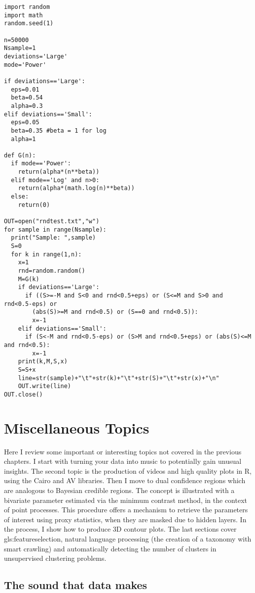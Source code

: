 \documentclass[oneside,10pt]{book}
\newcommand\Chapter[2]{
  \chapter[#1]{#1\\[2ex]\Large\itshape#2}
}
\begin{document}
\begin{lstlisting}
import random
import math
random.seed(1) 

n=50000
Nsample=1
deviations='Large'
mode='Power' 

if deviations=='Large':
  eps=0.01
  beta=0.54
  alpha=0.3
elif deviations=='Small':
  eps=0.05
  beta=0.35 #beta = 1 for log
  alpha=1

def G(n):
  if mode=='Power':
    return(alpha*(n**beta))
  elif mode=='Log' and n>0:
    return(alpha*(math.log(n)**beta))
  else:
    return(0)

OUT=open("rndtest.txt","w")
for sample in range(Nsample):
  print("Sample: ",sample)
  S=0
  for k in range(1,n):
    x=1
    rnd=random.random()
    M=G(k)
    if deviations=='Large':
      if ((S>=-M and S<0 and rnd<0.5+eps) or (S<=M and S>0 and rnd<0.5-eps) or 
        (abs(S)>=M and rnd<0.5) or (S==0 and rnd<0.5)):
        x=-1
    elif deviations=='Small':
      if (S<-M and rnd<0.5-eps) or (S>M and rnd<0.5+eps) or (abs(S)<=M and rnd<0.5):
        x=-1
    print(k,M,S,x)
    S=S+x
    line=str(sample)+"\t"+str(k)+"\t"+str(S)+"\t"+str(x)+"\n" 
    OUT.write(line)   
OUT.close()      
\end{lstlisting}

\Chapter{Miscellaneous Topics}{}

Here I review some important or interesting topics not covered in the previous chapters. I start with turning your data into music to 
potentially gain unusual insights. The second topic is the production of videos and high quality plots in R, using the Cairo and AV libraries. Then I move to dual confidence regions which are analogous to Bayesian credible regions. The concept 
 is illustrated with a bivariate parameter estimated via the minimum contrast method, in the context of point processes. This procedure offers a mechanism to retrieve
 the parameters of interest using proxy statistics, when they are masked due to  hidden layers. In the process, I show how to produce 3D contour plots. The last sections cover \gls{gls:featureselection},  natural language 
 processing (the creation of a taxonomy with smart crawling) and automatically detecting the number of clusters in unsupervised clustering problems.


\hypersetup{linkcolor=red}


\section{The sound that data makes}\label{sound23}
\end{document}
